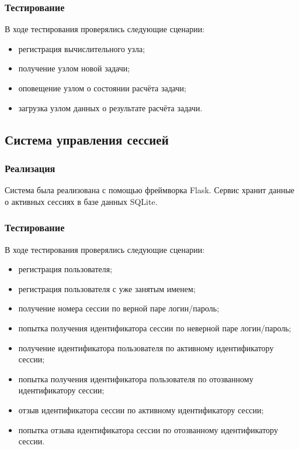 \documentclass[a4paper,12pt]{report}
\numberwithin{equation}{section}
\begin{document}
  \subsubsection{Тестирование}
  В ходе тестирования проверялись следующие сценарии:
  
  \begin{itemize}
    \item регистрация вычислительного узла;
    \item получение узлом новой задачи;
    \item оповещение узлом о состоянии расчёта задачи;
    \item загрузка узлом данных о результате расчёта задачи.
  \end{itemize}
  \subsection{Система управления сессией}
  \subsubsection{Реализация}
  Система была реализована с помощью фреймворка Flask.
  Сервис хранит данные о активных сессиях в базе данных SQLite.
  
  \subsubsection{Тестирование}
  В ходе тестирования проверялись следующие сценарии:
  
  \begin{itemize}
    \item регистрация пользователя;
    \item регистрация пользователя с уже занятым именем;
    \item получение номера сессии по верной паре логин/пароль;
    \item попытка получения идентификатора сессии по неверной паре логин/пароль;
    \item получение идентификатора пользователя по активному идентификатору сессии;
    \item попытка получения идентификатора пользователя по отозванному идентификатору сессии;
    \item отзыв идентификатора сессии по активному идентификатору сессии;
    \item попытка отзыва идентификатора сессии по отозванному идентификатору сессии.
  \end{itemize}
  
\end{document}
